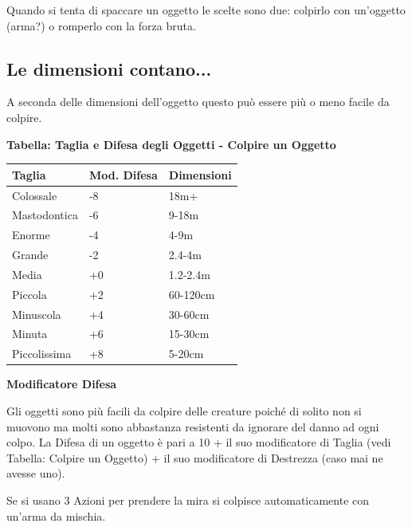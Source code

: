 \begin{multicols}{2}

\label{sfondare-ed-entrare}

Quando si tenta di spaccare un oggetto le scelte sono due: colpirlo con un'oggetto (arma?) o romperlo con la forza bruta.

\smallskip

\subsection{Le dimensioni contano...}

A seconda delle dimensioni dell'oggetto questo può essere più o meno facile da colpire.

\medskip

\textbf{Tabella: Taglia e Difesa degli Oggetti - Colpire un Oggetto}

\medskip

\noindent\begin{tabularx}{\linewidth}{Xll}
	\toprule
\rowcolor{gray!20}\textbf{Taglia} & \textbf{Mod. Difesa} & \textbf{Dimensioni}\\
\toprule
Colossale & -8 &18m+\\
\rowcolor{gray!20}Mastodontica & -6 &9-18m\\
Enorme & -4 &4-9m\\
\rowcolor{gray!20}Grande & -2 &2.4-4m\\
Media & +0 &1.2-2.4m\\
\rowcolor{gray!20}Piccola & +2 &60-120cm\\
Minuscola & +4 &30-60cm\\
\rowcolor{gray!20}Minuta & +6 &15-30cm\\
Piccolissima & +8 &5-20cm
\end{tabularx}

\medskip

\textbf{Modificatore Difesa}

Gli oggetti sono più facili da colpire delle creature poiché di solito non si muovono ma molti sono abbastanza resistenti da ignorare del danno ad ogni colpo. La Difesa di un oggetto è pari a 10 + il suo modificatore di Taglia (vedi Tabella: Colpire un Oggetto) + il suo modificatore di Destrezza (caso mai ne avesse uno).

Se si usano 3 Azioni per prendere la mira si colpisce automaticamente con un'arma da mischia.


\end{multicols}
